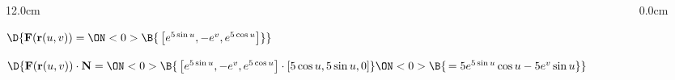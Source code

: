 \begin{frame}
\begin{columns}
\begin{column}{12.0cm}
\vspace{0.4cm}

$\D{{\bf F}({\bf r}(u,v)) = 
\ON<0>{\B{\,\left[e^{5\sin u}, -e^{v}, e^{5\cos u}\right]}}}$

\vspace{0.3cm}

$\D{{\bf F}({\bf r}(u,v)) \cdot {\bf N} = 
\ON<0>{\B{\,\left[e^{5\sin u}, -e^{v}, e^{5\cos u}\right] \cdot [5\cos u,5\sin u,0]}}
\ON<0>{\B{\, = 5e^{5\sin u}\cos u - 5e^v\sin u}}}$

\vspace{2.8cm}

	
\end{column}\begin{column}{0.0cm}\end{column}\end{columns}
\end{frame}

